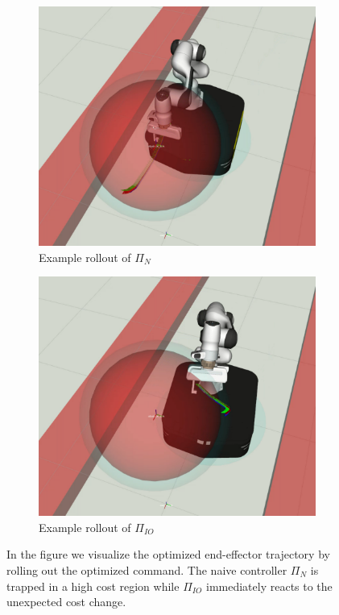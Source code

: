 \begin{figure}[t]
\centering
\begin{subfigure}{0.48\columnwidth}
    \includegraphics[width=\linewidth]{figures/obstacle_avoidance/rollouts_no_filter.pdf}
    \caption{Example rollout of $\Pi_{N}$}
\end{subfigure}%
\hfill
\begin{subfigure}{0.48\columnwidth}
    \includegraphics[width=\linewidth]{figures/obstacle_avoidance/rollouts_filter.pdf}
    \caption{Example rollout of $\Pi_{IO}$}
\end{subfigure}%
\hfill
\caption{In the figure we visualize the optimized end-effector trajectory by rolling out the optimized command. The naive controller $\Pi_{N}$ is trapped in a high cost region while $\Pi_{IO}$ immediately reacts to the unexpected cost change.}\label{fig:rollouts_comparison}
\end{figure}

